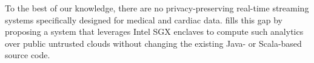 To the best of our knowledge, there are no privacy-preserving real-time streaming systems specifically designed for  medical and cardiac data. 
\projName fills this gap by proposing a system that leverages Intel SGX enclaves to compute such analytics over public untrusted clouds without changing the existing Java- or Scala-based source code.


